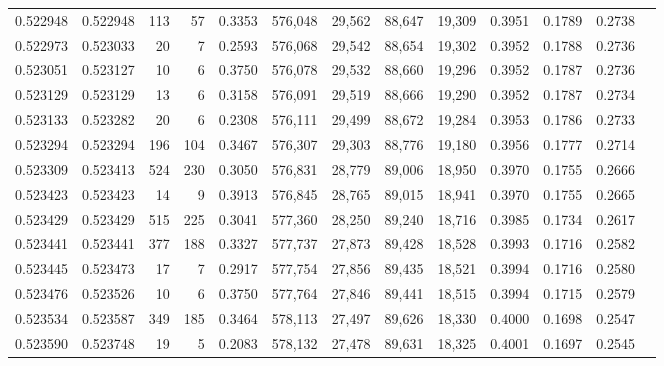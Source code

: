 \begin{tabular}{rrrrrrrrrrrrr}
0.522948 & 0.522948 &   113 &    57 &                                     0.3353 & 576,048 &  29,562 &  88,647 &  19,309 & 0.3951 & 0.1789 & 0.2738 \\
0.522973 & 0.523033 &    20 &     7 &                                     0.2593 & 576,068 &  29,542 &  88,654 &  19,302 & 0.3952 & 0.1788 & 0.2736 \\
0.523051 & 0.523127 &    10 &     6 &                                     0.3750 & 576,078 &  29,532 &  88,660 &  19,296 & 0.3952 & 0.1787 & 0.2736 \\
0.523129 & 0.523129 &    13 &     6 &                                     0.3158 & 576,091 &  29,519 &  88,666 &  19,290 & 0.3952 & 0.1787 & 0.2734 \\
0.523133 & 0.523282 &    20 &     6 &                                     0.2308 & 576,111 &  29,499 &  88,672 &  19,284 & 0.3953 & 0.1786 & 0.2733 \\
0.523294 & 0.523294 &   196 &   104 &                                     0.3467 & 576,307 &  29,303 &  88,776 &  19,180 & 0.3956 & 0.1777 & 0.2714 \\
0.523309 & 0.523413 &   524 &   230 &                                     0.3050 & 576,831 &  28,779 &  89,006 &  18,950 & 0.3970 & 0.1755 & 0.2666 \\
0.523423 & 0.523423 &    14 &     9 &                                     0.3913 & 576,845 &  28,765 &  89,015 &  18,941 & 0.3970 & 0.1755 & 0.2665 \\
0.523429 & 0.523429 &   515 &   225 &                                     0.3041 & 577,360 &  28,250 &  89,240 &  18,716 & 0.3985 & 0.1734 & 0.2617 \\
0.523441 & 0.523441 &   377 &   188 &                                     0.3327 & 577,737 &  27,873 &  89,428 &  18,528 & 0.3993 & 0.1716 & 0.2582 \\
0.523445 & 0.523473 &    17 &     7 &                                     0.2917 & 577,754 &  27,856 &  89,435 &  18,521 & 0.3994 & 0.1716 & 0.2580 \\
0.523476 & 0.523526 &    10 &     6 &                                     0.3750 & 577,764 &  27,846 &  89,441 &  18,515 & 0.3994 & 0.1715 & 0.2579 \\
0.523534 & 0.523587 &   349 &   185 &                                     0.3464 & 578,113 &  27,497 &  89,626 &  18,330 & 0.4000 & 0.1698 & 0.2547 \\
0.523590 & 0.523748 &    19 &     5 &                                     0.2083 & 578,132 &  27,478 &  89,631 &  18,325 & 0.4001 & 0.1697 & 0.2545 \\

\end{tabular}
